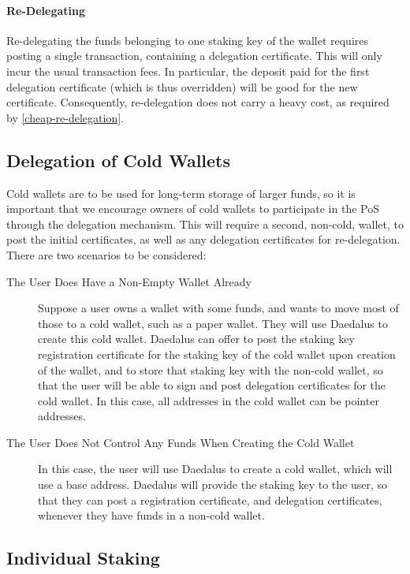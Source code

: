 \documentclass[11pt,a4paper]{article}
\begin{document}
\paragraph{Re-Delegating}
Re-delegating the funds belonging to one staking key of the wallet
requires posting a single transaction, containing a delegation
certificate. This will only incur the usual transaction fees. In
particular, the deposit paid for the first delegation certificate
(which is thus overridden) will be good for the new
certificate. Consequently, re-delegation does not carry a heavy cost,
as required by \cref{cheap-re-delegation}.

\subsection{Delegation of Cold Wallets}
\label{delegation-of-cold-wallets}

Cold wallets are to be used for long-term storage of larger funds, so
it is important that we encourage owners of cold wallets to
participate in the PoS through the delegation mechanism. This will
require a second, non-cold, wallet, to post the initial certificates,
as well as any delegation certificates for re-delegation. There are
two scenarios to be considered:

\begin{description}
\item[The User Does Have a Non-Empty Wallet Already] Suppose a user
  owns a wallet with some funds, and wants to move most of those to a
  cold wallet, such as a paper wallet. They will use Daedalus to
  create this cold wallet. Daedalus can offer to post the staking key
  registration certificate for the staking key of the cold wallet upon
  creation of the wallet, and to store that staking key with the
  non-cold wallet, so that the user will be able to sign and post
  delegation certificates for the cold wallet. In this case, all
  addresses in the cold wallet can be pointer addresses.
\item[The User Does Not Control Any Funds When Creating the Cold
  Wallet] In this case, the user will use Daedalus to create a cold
  wallet, which will use a base address. Daedalus will provide the
  staking key to the user, so that they can post a registration
  certificate, and delegation certificates, whenever they have funds
  in a non-cold wallet.
\end{description}

\subsection{Individual Staking}
\label{individual-staking}
\end{document}
